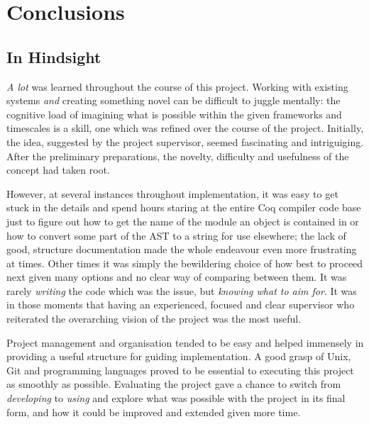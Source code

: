 \chapter{Conclusions}


\section{In Hindsight}

\emph{A lot} was learned throughout the course of this project. Working with
existing systems \emph{and} creating something novel can be difficult to juggle
mentally: the cognitive load of imagining what is possible within the given
frameworks and timescales is a skill, one which was refined over the course of
the project. Initially, the idea, suggested by the project supervisor, seemed
fascinating and intriguiging. After the preliminary preparations, the novelty,
difficulty and usefulness of the concept had taken root.

However, at several instances throughout implementation, it was easy to get
stuck in the details and spend hours staring at the entire Coq compiler code
base just to figure out how to get the name of the module an object is contained
in or how to convert some part of the AST to a string for use elsewhere; the
lack of good, structure documentation made the whole endeavour even more
frustrating at times. Other times it was simply the bewildering choice of how
best to proceed next given many options and no clear way of comparing between
them. It was rarely \emph{writing} the code which was the issue, but
\emph{knowing what to aim for}. It was in those moments that having an
experienced, focused and clear supervisor who reiterated the overarching vision
of the project was the most useful.

Project management and organisation tended to be easy and helped immensely in
providing a useful structure for guiding implementation. A good grasp of Unix,
Git and programming languages proved to be essential to executing this project
as smoothly as possible. Evaluating the project gave a chance to switch from
\emph{developing} to \emph{using} and explore what was possible with the project
in its final form, and how it could be improved and extended given more time.

